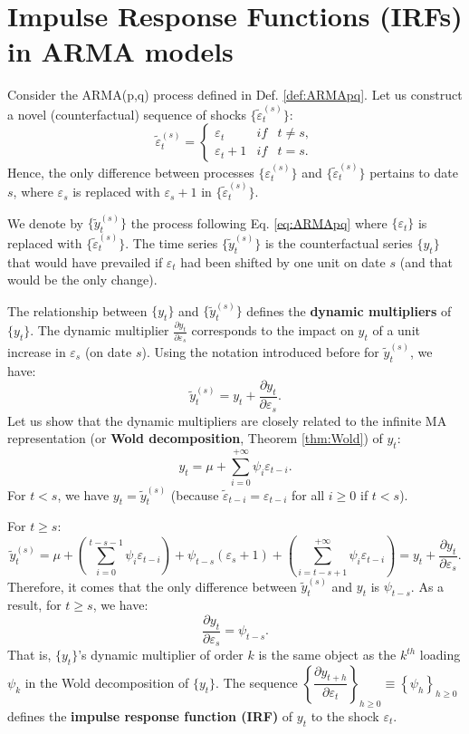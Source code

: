 \documentclass[
  12pt,
]{book}
\theoremstyle{definition}
\theoremstyle{definition}
\theoremstyle{definition}
\theoremstyle{definition}
\theoremstyle{remark}
\begin{document}
\hypertarget{IRFARMA}{%
\section{Impulse Response Functions (IRFs) in ARMA models}\label{IRFARMA}}

Consider the ARMA(p,q) process defined in Def. \ref{def:ARMApq}. Let us construct a novel (counterfactual) sequence of shocks \(\{\tilde\varepsilon_t^{(s)}\}\):
\[
\tilde\varepsilon_t^{(s)} = \left\{
\begin{array}{lcc}
\varepsilon_{t} & if & t \ne s,\\
\varepsilon_{t} + 1 &if& t=s.
\end{array}
\right.
\]
Hence, the only difference between processes \(\{\varepsilon_t^{(s)}\}\) and \(\{\tilde\varepsilon_t^{(s)}\}\) pertains to date \(s\), where \(\varepsilon_s\) is replaced with \(\varepsilon_s + 1\) in \(\{\tilde\varepsilon_t^{(s)}\}\).

We denote by \(\{\tilde{y}_t^{(s)}\}\) the process following Eq. \eqref{eq:ARMApq} where \(\{\varepsilon_t\}\) is replaced with \(\{\tilde\varepsilon_t^{(s)}\}\). The time series \(\{\tilde{y}_t^{(s)}\}\) is the counterfactual series \(\{y_t\}\) that would have prevailed if \(\varepsilon_t\) had been shifted by one unit on date \(s\) (and that would be the only change).

The relationship between \(\{y_t\}\) and \(\{\tilde{y}_t^{(s)}\}\) defines the \textbf{dynamic multipliers} of \(\{y_t\}\). The dynamic multiplier \(\frac{\partial y_t}{\partial \varepsilon_{s}}\) corresponds to the impact on \(y_t\) of a unit increase in \(\varepsilon_s\) (on date \(s\)). Using the notation introduced before for \(\tilde{y}_t^{(s)}\), we have:
\[
\tilde{y}_t^{(s)} = y_t + \frac{\partial y_t}{\partial \varepsilon_{s}}.
\]
Let us show that the dynamic multipliers are closely related to the infinite MA representation (or \textbf{Wold decomposition}, Theorem \ref{thm:Wold}) of \(y_t\):
\[
y_t = \mu + \sum_{i=0}^{+\infty} \psi_i \varepsilon_{t-i}.
\]
For \(t<s\), we have \(y_t = \tilde{y}_t^{(s)}\) (because \(\tilde{\varepsilon}_{t-i}= \varepsilon_{t-i}\) for all \(i \ge 0\) if \(t<s\)).

For \(t \ge s\):
\[
\tilde{y}_t^{(s)} = \mu + \left( \sum_{i=0}^{t-s-1} \psi_i \varepsilon_{t-i} \right) + \psi_{t-s}(\varepsilon_{s}+1) + \left( \sum_{i=t-s+1}^{+\infty} \psi_i \varepsilon_{t-i} \right)=y_t + \frac{\partial y_t}{\partial \varepsilon_{s}}.
\]
Therefore, it comes that the only difference between \(\tilde{y}_t^{(s)}\) and \(y_t\) is \(\psi_{t-s}\). As a result, for \(t \ge s\), we have:
\[
\boxed{\dfrac{\partial y_t}{\partial \varepsilon_{s}}=\psi_{t-s}.}
\]
That is, \(\{y_t\}\)'s dynamic multiplier of order \(k\) is the same object as the \(k^{th}\) loading \(\psi_k\) in the Wold decomposition of \(\{y_t\}\). The sequence \(\left\{\dfrac{\partial y_{t+h}}{\partial \varepsilon_{t}}\right\}_{h \ge 0} \equiv \left\{\psi_h\right\}_{h \ge 0}\) defines the \textbf{impulse response function (IRF)} of \(y_t\) to the shock \(\varepsilon_t\).
\end{document}
